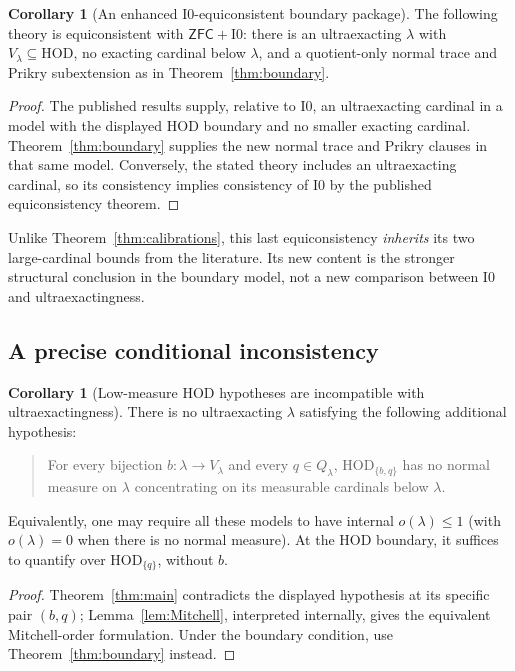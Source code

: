 \documentclass[11pt,letterpaper]{article}
\theoremstyle{definition}
\newtheorem{corollary}[definition]{Corollary}
\numberwithin{equation}{section}
\newcommand{\ZFC}{\mathsf{ZFC}}
\newcommand{\HOD}{\mathrm{HOD}}
\newcommand{\Izero}{\mathrm{I0}}
\begin{document}
\begin{corollary}[An enhanced I0-equiconsistent boundary package]\label{cor:boundary-con}
The following theory is equiconsistent with $\ZFC+\Izero$:
there is an ultraexacting $\lambda$ with $V_\lambda\subseteq\HOD$,
no exacting cardinal below $\lambda$, and a quotient-only normal
trace and Prikry subextension as in Theorem~\ref{thm:boundary}.
\end{corollary}

\begin{proof}
The published results \cite[Theorem~4.5, Proposition~3.9 and
Corollary~3.10]{abgl} supply, relative to $\Izero$, an ultraexacting
cardinal in a model with the displayed HOD boundary and no smaller
exacting cardinal. Theorem~\ref{thm:boundary} supplies the new normal
trace and Prikry clauses in that same model. Conversely, the stated
theory includes an ultraexacting cardinal, so its consistency implies
consistency of $\Izero$ by the published equiconsistency theorem.
\end{proof}

Unlike Theorem~\ref{thm:calibrations}, this last equiconsistency
\emph{inherits} its two large-cardinal bounds from the literature. Its
new content is the stronger structural conclusion in the boundary
model, not a new comparison between $\Izero$ and ultraexactingness.

\subsection{A precise conditional inconsistency}

\begin{corollary}[Low-measure HOD hypotheses are incompatible with
ultraexactingness]\label{cor:incompatibility}
There is no ultraexacting $\lambda$ satisfying the following additional
hypothesis:
\begin{quote}
For every bijection $b:\lambda\to V_\lambda$ and every $q\in Q_\lambda$,
$\HOD_{\{b,q\}}$ has no normal measure on $\lambda$ concentrating on
its measurable cardinals below $\lambda$.
\end{quote}
Equivalently, one may require all these models to have internal
$o(\lambda)\le1$ (with $o(\lambda)=0$ when there is no normal measure). At the HOD boundary, it suffices to quantify over
$\HOD_{\{q\}}$, without $b$.
\end{corollary}

\begin{proof}
Theorem~\ref{thm:main} contradicts the displayed hypothesis at its
specific pair $(b,q)$; Lemma~\ref{lem:Mitchell}, interpreted internally,
gives the equivalent Mitchell-order formulation. Under the boundary
condition, use Theorem~\ref{thm:boundary} instead.
\end{proof}
\end{document}

